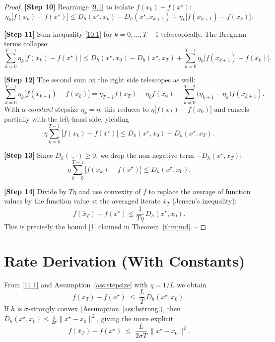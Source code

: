 \documentclass[11pt]{article}
\newcommand{\D}{D}
\begin{document}
\begin{proof}
\textbf{[Step 10]} Rearrange \eqref{9.1} to isolate $f(x_k)-f(x^{\star})$:
\[
\eta_k\bigl[f(x_k)-f(x^{\star})\bigr]
\le \D_h(x^{\star},x_k)-\D_h(x^{\star},x_{k+1})
+\eta_k\bigl[f(x_{k+1})-f(x_k)\bigr].
\tag{10.1}
\]

\textbf{[Step 11]} Sum inequality \eqref{10.1} for $k=0,\dots,T-1$ telescopically. The Bregman terms collapse:
\[
\sum_{k=0}^{T-1}\eta_k\bigl[f(x_k)-f(x^{\star})\bigr]
\le \D_h(x^{\star},x_0)-\D_h(x^{\star},x_T)
+\sum_{k=0}^{T-1}\eta_k\bigl[f(x_{k+1})-f(x_k)\bigr].
\tag{11.1}
\]

\textbf{[Step 12]} The second sum on the right side telescopes as well:
\[
\sum_{k=0}^{T-1}\eta_k\bigl[f(x_{k+1})-f(x_k)\bigr]
= \eta_{T-1}f(x_T)-\eta_0f(x_0)-\sum_{k=0}^{T-2}\bigl(\eta_{k+1}-\eta_k\bigr)f(x_{k+1}).
\]
With a \emph{constant} stepsize $\eta_k=\eta$, this reduces to $\eta\bigl[f(x_T)-f(x_0)\bigr]$ and cancels partially with the left‑hand side, yielding
\[
\eta\sum_{k=0}^{T-1}\bigl[f(x_k)-f(x^{\star})\bigr]
\le \D_h(x^{\star},x_0)-\D_h(x^{\star},x_T).
\tag{12.1}
\]

\textbf{[Step 13]} Since $\D_h(\cdot,\cdot)\ge0$, we drop the non‑negative term $-\D_h(x^{\star},x_T)$:
\[
\eta\sum_{k=0}^{T-1}\bigl[f(x_k)-f(x^{\star})\bigr]\le \D_h(x^{\star},x_0).
\tag{13.1}
\]

\textbf{[Step 14]} Divide by $T\eta$ and use convexity of $f$ to replace the average of function values by the function value at the averaged iterate $\bar x_T$ (Jensen’s inequality):
\[
f(\bar x_T)-f(x^{\star})
\le \frac{1}{T\eta}\,\D_h(x^{\star},x_0).
\tag{14.1}
\]
This is precisely the bound \eqref{1} claimed in Theorem~\ref{thm:md}. $\square$
\end{proof}

\section*{Rate Derivation (With Constants)}
From \eqref{14.1} and Assumption~\ref{ass:stepsize} with $\eta=1/L$ we obtain
\[
f(\bar x_T)-f(x^{\star})\;\le\;\frac{L}{T}\,\D_h(x^{\star},x_0).
\]
If $h$ is $\sigma$‑strongly convex (Assumption~\ref{ass:hstrong}), then $\D_h(x^{\star},x_0)\le\frac{1}{2\sigma}\|x^{\star}-x_0\|^2$, giving the more explicit
\[
f(\bar x_T)-f(x^{\star})\;\le\;\frac{L}{2\sigma T}\,\|x^{\star}-x_0\|^2.
\]
\end{document}
